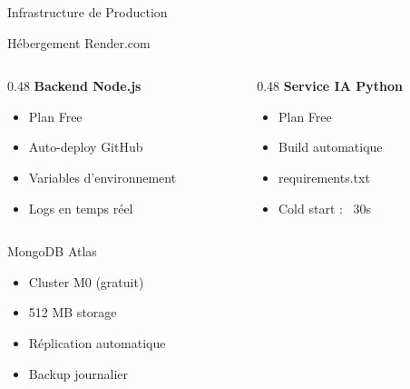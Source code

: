 \documentclass[aspectratio=169]{beamer}
\begin{document}
\begin{frame}{Infrastructure de Production}
    \begin{block}{Hébergement Render.com}
        \begin{columns}[T]
            \begin{column}{0.48\textwidth}
                \textbf{Backend Node.js}
                \begin{itemize}
                    \item Plan Free
                    \item Auto-deploy GitHub
                    \item Variables d'environnement
                    \item Logs en temps réel
                \end{itemize}
            \end{column}
            \begin{column}{0.48\textwidth}
                \textbf{Service IA Python}
                \begin{itemize}
                    \item Plan Free
                    \item Build automatique
                    \item requirements.txt
                    \item Cold start : ~30s
                \end{itemize}
            \end{column}
        \end{columns}
    \end{block}

    \vspace{0.3cm}

    \begin{block}{MongoDB Atlas}
        \begin{itemize}
            \item Cluster M0 (gratuit)
            \item 512 MB storage
            \item Réplication automatique
            \item Backup journalier
        \end{itemize}
    \end{block}
\end{frame}
\end{document}
